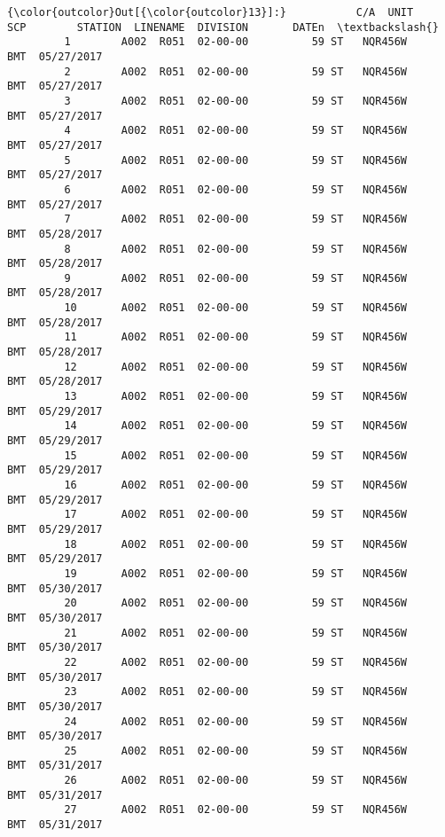 \documentclass[11pt]{article}
\begin{document}
\begin{Verbatim}[commandchars=\\\{\}]
{\color{outcolor}Out[{\color{outcolor}13}]:}           C/A  UNIT       SCP        STATION  LINENAME  DIVISION       DATEn  \textbackslash{}
         1        A002  R051  02-00-00          59 ST   NQR456W       BMT  05/27/2017   
         2        A002  R051  02-00-00          59 ST   NQR456W       BMT  05/27/2017   
         3        A002  R051  02-00-00          59 ST   NQR456W       BMT  05/27/2017   
         4        A002  R051  02-00-00          59 ST   NQR456W       BMT  05/27/2017   
         5        A002  R051  02-00-00          59 ST   NQR456W       BMT  05/27/2017   
         6        A002  R051  02-00-00          59 ST   NQR456W       BMT  05/27/2017   
         7        A002  R051  02-00-00          59 ST   NQR456W       BMT  05/28/2017   
         8        A002  R051  02-00-00          59 ST   NQR456W       BMT  05/28/2017   
         9        A002  R051  02-00-00          59 ST   NQR456W       BMT  05/28/2017   
         10       A002  R051  02-00-00          59 ST   NQR456W       BMT  05/28/2017   
         11       A002  R051  02-00-00          59 ST   NQR456W       BMT  05/28/2017   
         12       A002  R051  02-00-00          59 ST   NQR456W       BMT  05/28/2017   
         13       A002  R051  02-00-00          59 ST   NQR456W       BMT  05/29/2017   
         14       A002  R051  02-00-00          59 ST   NQR456W       BMT  05/29/2017   
         15       A002  R051  02-00-00          59 ST   NQR456W       BMT  05/29/2017   
         16       A002  R051  02-00-00          59 ST   NQR456W       BMT  05/29/2017   
         17       A002  R051  02-00-00          59 ST   NQR456W       BMT  05/29/2017   
         18       A002  R051  02-00-00          59 ST   NQR456W       BMT  05/29/2017   
         19       A002  R051  02-00-00          59 ST   NQR456W       BMT  05/30/2017   
         20       A002  R051  02-00-00          59 ST   NQR456W       BMT  05/30/2017   
         21       A002  R051  02-00-00          59 ST   NQR456W       BMT  05/30/2017   
         22       A002  R051  02-00-00          59 ST   NQR456W       BMT  05/30/2017   
         23       A002  R051  02-00-00          59 ST   NQR456W       BMT  05/30/2017   
         24       A002  R051  02-00-00          59 ST   NQR456W       BMT  05/30/2017   
         25       A002  R051  02-00-00          59 ST   NQR456W       BMT  05/31/2017   
         26       A002  R051  02-00-00          59 ST   NQR456W       BMT  05/31/2017   
         27       A002  R051  02-00-00          59 ST   NQR456W       BMT  05/31/2017   

\end{Verbatim}
\end{document}
